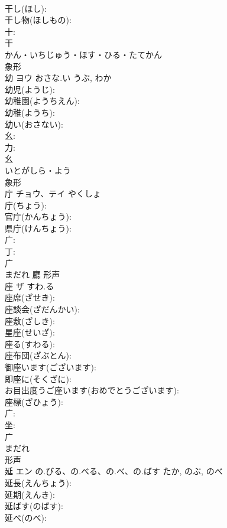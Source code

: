 \documentclass[8pt]{extreport}
\begin{document}
\begin{CJK}{UTF8}{min}
\\	干し(ほし): 
\\	干し物(ほしもの): 
\\	十: 
\\	干	
\\	かん・いちじゅう・ほす・ひる・たてかん	
\\	象形 
\\	幼	ヨウ	おさな.い	うぶ, わか	
\\	幼児(ようじ): 
\\	幼稚園(ようちえん): 
\\	幼稚(ようち): 
\\	幼い(おさない): 
\\	幺: 
\\	力: 
\\	幺	
\\	いとがしら・よう	
\\	象形 
\\	庁	チョウ、テイ	やくしょ		
\\	庁(ちょう): 
\\	官庁(かんちょう): 
\\	県庁(けんちょう): 
\\	广: 
\\	丁: 
\\	广	
\\	まだれ	廳	形声 
\\	座	ザ	すわ.る		
\\	座席(ざせき): 
\\	座談会(ざだんかい): 
\\	座敷(ざしき): 
\\	星座(せいざ): 
\\	座る(すわる): 
\\	座布団(ざぶとん): 
\\	御座います(ございます): 
\\	即座に(そくざに): 
\\	お目出度うご座います(おめでとうございます): 
\\	座標(ざひょう): 
\\	广: 
\\	坐: 
\\	广	
\\	まだれ	
\\	形声 
\\	延	エン	の.びる、の.べる、の.べ、の.ばす	たか, のぶ, のべ	
\\	延長(えんちょう): 
\\	延期(えんき): 
\\	延ばす(のばす): 
\\	延べ(のべ): 

\end{CJK}
\end{document}
